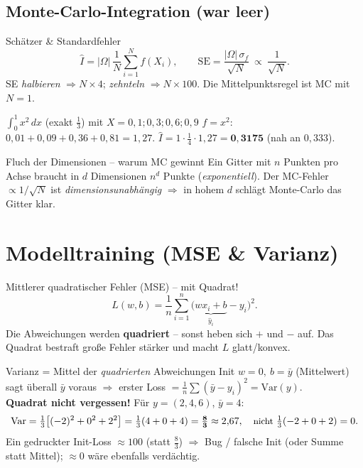 \documentclass[a4paper,11pt]{article}
\begin{document}
\subsection{Monte-Carlo-Integration (war leer)}
\begin{satz}{Schätzer \& Standardfehler}
\[
  \hat I=|\Omega|\,\frac1N\sum_{i=1}^N f(X_i),\qquad
  \mathrm{SE}=\frac{|\Omega|\,\sigma_f}{\sqrt N}\ \propto\ \frac{1}{\sqrt N}.
\]
SE \emph{halbieren} $\Rightarrow N\times4$;\; \emph{zehnteln} $\Rightarrow N\times100$.
Die Mittelpunktsregel ist MC mit $N=1$.
\end{satz}

\begin{bsp}{$\int_0^1 x^2\,dx$ (exakt $\tfrac13$) mit $X=0{,}1;0{,}3;0{,}6;0{,}9$}
$f=x^2$: $0{,}01+0{,}09+0{,}36+0{,}81=1{,}27$.\;
$\hat I=1\cdot\tfrac14\cdot1{,}27=\mathbf{0{,}3175}$ (nah an $0{,}333$).
\end{bsp}

\begin{intu}{Fluch der Dimensionen -- warum MC gewinnt}
Ein Gitter mit $n$ Punkten pro Achse braucht in $d$ Dimensionen $n^d$ Punkte (\emph{exponentiell}).
Der MC-Fehler $\propto 1/\sqrt N$ ist \emph{dimensionsunabhängig} $\Rightarrow$ in hohem $d$ schlägt
Monte-Carlo das Gitter klar.
\end{intu}

\section{Modelltraining (MSE \& Varianz)}

\begin{defi}{Mittlerer quadratischer Fehler (MSE) -- mit Quadrat!}
\[
  L(w,b)=\frac1n\sum_{i=1}^n\bigl(\underbrace{w x_i+b}_{\hat y_i}-y_i\bigr)^2.
\]
Die Abweichungen werden \textbf{quadriert} -- sonst heben sich $+$ und $-$ auf. Das Quadrat bestraft
große Fehler stärker und macht $L$ glatt/konvex.
\end{defi}

\begin{falle}{Varianz = Mittel der \emph{quadrierten} Abweichungen}
Init $w=0,\ b=\bar y$ (Mittelwert) sagt überall $\bar y$ voraus $\Rightarrow$ erster Loss
$=\tfrac1n\sum(\bar y-y_i)^2=\mathrm{Var}(y)$.\\
\textbf{Quadrat nicht vergessen!} Für $y=(2,4,6)$, $\bar y=4$:
\[
  \mathrm{Var}=\tfrac13\bigl[(-2)^2+0^2+2^2\bigr]=\tfrac13(4+0+4)=\mathbf{\tfrac83}\approx2{,}67,
  \quad\text{\small nicht } \tfrac13(-2+0+2)=0.
\]
Ein gedruckter Init-Loss $\approx100$ (statt $\tfrac83$) $\Rightarrow$ Bug / falsche Init
(oder Summe statt Mittel); $\approx0$ wäre ebenfalls verdächtig.
\end{falle}
\end{document}
